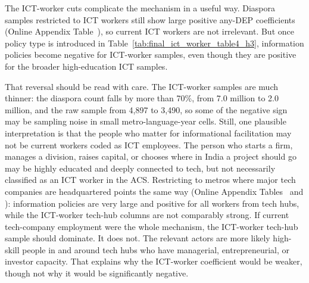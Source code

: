 \documentclass[12pt]{article}
\begin{document}
The ICT-worker cuts complicate the mechanism in a useful way. Diaspora samples restricted to ICT workers still show large positive any-DEP coefficients (Online Appendix Table~), so current ICT workers are not irrelevant. But once policy type is introduced in Table~\ref{tab:final_ict_worker_table4_h3}, information policies become negative for ICT-worker samples, even though they are positive for the broader high-education ICT samples.



 That reversal should be read with care. The ICT-worker samples are much thinner: the diaspora count falls by more than 70\%, from 7.0 million to 2.0 million, and the raw sample from 4,897 to 3,490, so some of the negative sign may be sampling noise in small metro-language-year cells. Still, one plausible interpretation is that the people who matter for informational facilitation may not be current workers coded as ICT employees. The person who starts a firm, manages a division, raises capital, or chooses where in India a project should go may be highly educated and deeply connected to tech, but not necessarily classified as an ICT worker in the ACS. Restricting to metros where major tech companies are headquartered points the same way (Online Appendix Tables~ and ): information policies are very large and positive for all workers from tech hubs, while the ICT-worker tech-hub columns are not comparably strong. If current tech-company employment were the whole mechanism, the ICT-worker tech-hub sample should dominate. It does not. The relevant actors are more likely high-skill people in and around tech hubs who have managerial, entrepreneurial, or investor capacity. That explains why the ICT-worker coefficient would be weaker, though not why it would be significantly negative.
\end{document}
